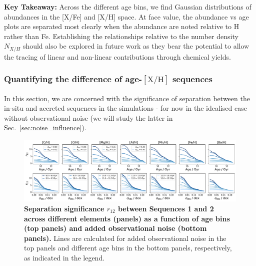 \documentclass[fleqn,usenatbib]{mnras}
\begin{document}
\textbf{Key Takeaway:} Across the different age bins, we find Gaussian distributions of abundances in the {[X/Fe]} and {[X/H]} space. At face value, the abundance vs age plots are separated most clearly when the abundance are noted relative to H rather than Fe. Establishing the relationships relative to the number density $N_{X/H}$ should also be explored in future work as they bear the potential to allow the tracing of linear and non-linear contributions through chemical yields.

\subsubsection{Quantifying the difference of age-{$\mathrm{[X/H]}$} sequences}

In this section, we are concerned with the significance of separation between the in-situ and accreted sequences in the simulations - for now in the idealised case without observational noise (we will study the latter in Sec.~\ref{sec:noise_influence}).

\begin{figure}
	\includegraphics[width=\textwidth]{figures/r12_for_sigmaobs.pdf}
    \caption{
    \textbf{Separation significance $r_{12}$ between Sequences 1 and 2 across different elements (panels) as a function of age bins (top panels) and added observational noise (bottom panels).} Lines are calculated for added observational noise in the top panels and different age bins in the bottom panels, respectively, as indicated in the legend.}
    \label{fig:r12_for_sigmaobs}
\end{figure}
\end{document}
